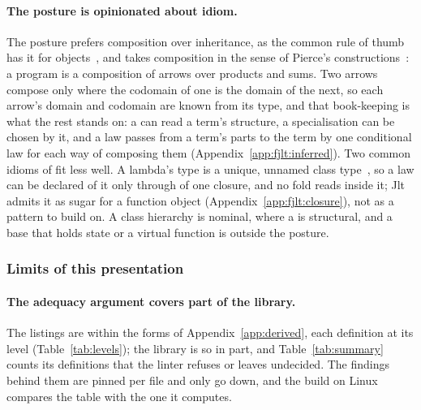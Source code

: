 \paragraph{The posture is opinionated about idiom.}
The posture prefers composition over inheritance, as the common rule of thumb has it for objects~\cite{gamma1995design}, and takes composition in the sense of Pierce's constructions~\cite{pierce1991basic}: a program is a composition of arrows over products and sums.
Two arrows compose only where the codomain of one is the domain of the next, so each arrow's domain and codomain are known from its type, and that book-keeping is what the rest stands on: a  can read a term's structure, a specialisation can be chosen by it, and a law passes from a term's parts to the term by one conditional law for each way of composing them (Appendix~\ref{app:fjlt:inferred}).
Two common idioms of \Cpp{} fit less well.
A lambda's type is a unique, unnamed class type~\cite[{\texttt{expr.prim.lambda.closure}}]{cpp23standard}, so a law can be declared of it only through  of one closure, and no fold reads inside it; Jlt admits it as sugar for a function object (Appendix~\ref{app:fjlt:closure}), not as a pattern to build on.
A class hierarchy is nominal, where a  is structural, and a base that holds state or a virtual function is outside the posture.

\subsubsection*{Limits of this presentation}

\paragraph{The adequacy argument covers part of the library.}
The listings are within the forms of Appendix~\ref{app:derived}, each definition at its level (Table~\ref{tab:levels}); the library is so in part, and Table~\ref{tab:summary} counts its definitions that the linter refuses or leaves undecided.
The findings behind them are pinned per file and only go down, and the build on Linux compares the table with the one it computes.


